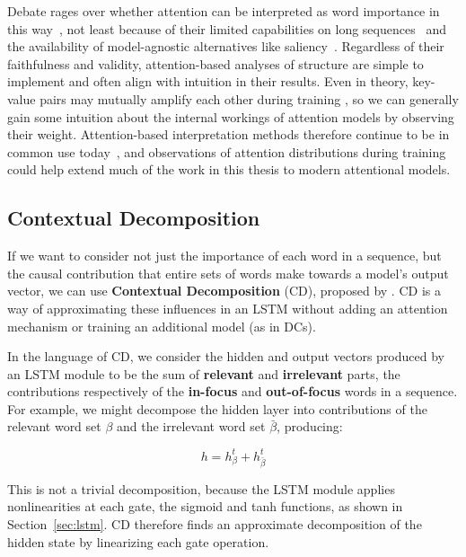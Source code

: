 Debate rages over whether attention can be interpreted as word importance in this way~\citep{jain_attention_2019,serrano_is_2019,wiegreffe_attention_2019,vashishth_attention_2019,brunner_validity_2019}, not least because of their limited capabilities on long sequences~\citep{hahn_theoretical_2019,brunner_validity_2019} and the availability of model-agnostic alternatives like saliency~\citep{Bastings2020TheEI}. Regardless of their faithfulness and validity, attention-based analyses of structure are simple to implement and often align with intuition in their results. Even in theory, key-value pairs may mutually amplify each other during training \citep{lu_dynamics_2020}, so we can generally gain some intuition about the internal workings of attention models by observing their weight. Attention-based interpretation methods therefore continue to be in common use today~\citep{belinkov_analysis_2018,rogers_primer_2020}, and observations of attention distributions during training could help extend much of the work in this thesis to modern attentional models.
 
 \subsection{Contextual Decomposition}
 
If we want to consider not just the importance of each word in a sequence, but the causal contribution that entire sets of words make towards a model's output vector, we can use \textbf{Contextual Decomposition} (CD), proposed by \citet{murdoch_beyond_2018}. CD is a way of approximating these influences in an LSTM without adding an attention mechanism or training an additional model (as in DCs).

In the language of CD, we consider the hidden and output vectors produced by an LSTM module to be the sum of \textbf{relevant} and \textbf{irrelevant} parts, the contributions respectively of the \textbf{in-focus} and \textbf{out-of-focus} words in a sequence. For example, we might decompose the hidden layer into contributions of the relevant word set $\beta$ and the irrelevant word set $\bar{\beta}$, producing:

\begin{equation}
    h = h^t_{\beta} + h^t_{\bar{\beta}}
\end{equation}

This is not a trivial decomposition, because the LSTM module applies nonlinearities at each gate, the sigmoid and tanh functions, as shown in Section~\ref{sec:lstm}. CD therefore finds an approximate decomposition of the hidden state by linearizing each gate operation. 

